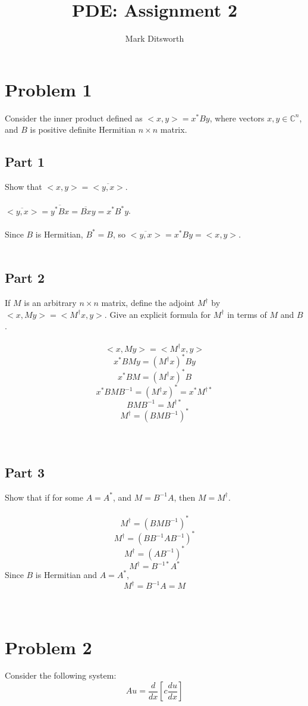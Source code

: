 \documentclass{amsart}
\title{PDE: Assignment 2}
\author{Mark Ditsworth}
\begin{document}
	\maketitle
	
	\section{Problem 1}
	Consider the inner product defined as $<x,y> = x^*By$, where vectors $x,y \in \mathbb{C}^n$, and $B$ is positive definite Hermitian $n\times n$ matrix.
	
	\subsection{Part 1}
	Show that $<x,y> = \overline{<y,x>}$.
	\\\\
	$\overline{<y,x>} = \overline{y^*Bx} = \overline{Bx}y = x^*B^*y$.
	\\\\
	Since $B$ is Hermitian, $B^* = B$, so $\overline{<y,x>} = x^*By = {<x,y>}$.
	\\\\
	\subsection{Part 2}
	If $M$ is an arbitrary $n\times n$ matrix, define the adjoint $M^\dag$ by $<x,My> = <M^\dag x,y>$. Give an explicit formula for $M^\dag$ in terms of $M$ and $B$.
	\\\\
	\[ <x,My> = <M^\dag x,y>
	\]
	\[ x^*BMy = (M^\dag x)^*By
	\]
	\[ x^*BM = (M^\dagger x)^*B
	\]
	\[ x^*BMB^{-1} = (M^\dagger x)^* = x^*M^{\dagger *}
	\]
	\[ BMB^{-1} = M^{\dagger *}
	\]
	\[ M^\dagger = (BMB^{-1})^*
	\]
	\\\\
	\subsection{Part 3}
	Show that if for some $A=A^*$, and $M=B^{-1}A$, then $M=M^\dagger$.
	\\\\
	\[ M^\dagger = (BMB^{-1})^*
	\]
	\[ M^\dagger = (BB^{-1}AB^{-1})^*
	\]
	\[ M^\dagger = (AB^{-1})^*
	\]
	\[ M^\dagger = B^{-1*}A^*
	\]
	Since $B$ is Hermitian and $A=A^*$,
	\[ M^\dagger = B^{-1}A = M
	\]
	\\\\
	\section{Problem 2}
	Consider the following system:
	\[ \hat{A}u = \frac{d}{dx}\left[c\frac{du}{dx}\right]
	\]
\end{document}
